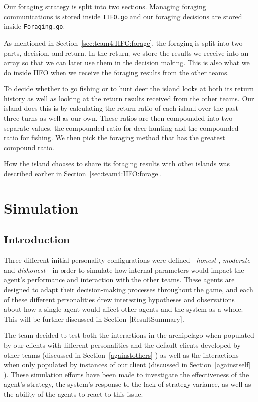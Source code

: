 Our foraging strategy is split into two sections. Managing foraging communications is stored inside \texttt{IIFO.go} and our foraging decisions are stored inside \texttt{Foraging.go}.

As mentioned in Section~\ref{sec:team4:IIFO:forage}, 
the foraging is split into two parts, decision, and return. In the return, we store the results we receive into an array so that we can later use them in the decision making. This is also what we do inside IIFO when we receive the foraging results from the other teams. 

To decide whether to go fishing or to hunt deer the island looks at both its return history as well as looking at the return results received from the other teams. Our island does this is by calculating the return ratio of each island over the past three turns as well as our own. These ratios are then compounded into two separate values, the compounded ratio for deer hunting and the compounded ratio for fishing.  We then pick the foraging method that has the greatest compound ratio. 

How the island chooses to share its foraging results with other islands was described earlier in Section~\ref{sec:team4:IIFO:forage}. 


\section{Simulation}\label{sec:team4:simulation}


\subsection{Introduction}
Three different initial personality configurations were defined -
\emph{honest} , \emph{moderate} and \emph{dishonest} - in order to simulate how internal parameters would impact the agent's performance and interaction with the other teams.
These agents are designed to adapt their decision-making processes throughout the game, and each of these different personalities drew interesting hypotheses and observations about how a single agent would affect other agents and the system as a whole. This will be further discussed in Section~\ref{ResultSummary}. 



The team decided to test both the interactions in the archipelago when populated by our clients with different personalities and the default clients developed by other teams (discussed in Section~\ref{againstothers} ) as well as the interactions when only populated by instances of our client (discussed in Section~\ref{againstself} ). These simulation efforts have been made to investigate the effectiveness of the agent's strategy, the system's response to the lack of strategy variance, as well as the ability of the agents to react to this issue.

